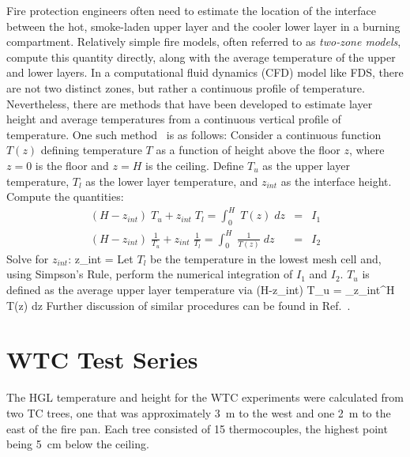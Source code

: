 Fire protection engineers often need to estimate the location of the
interface between the hot, smoke-laden upper layer and the cooler
lower layer in a burning compartment.  Relatively simple fire models,
often referred to as {\em two-zone models}, compute this quantity
directly, along with the average temperature of the upper and lower
layers.  In a computational fluid dynamics (CFD) model like FDS, there
are not two distinct zones, but rather a continuous profile of
temperature. Nevertheless, there are methods that have been developed
to estimate layer height and average temperatures from a continuous
vertical profile of temperature. One such
method~\cite{Janssens:JFS1992} is as follows: Consider a continuous
function $T(z)$ defining temperature $T$ as a function of height above
the floor $z$, where $z=0$ is the floor and $z=H$ is the
ceiling. Define $T_u$ as the upper layer temperature, $T_l$ as the
lower layer temperature, and $z_{int}$ as the interface
height. Compute the quantities:
\begin{eqnarray*} (H-z_{int})\; T_u + z_{int} \; T_l = \int_0^H \; T(z) \; dz &=& I_1 \\
                  (H-z_{int})\; \frac{1}{T_u} + z_{int} \; \frac{1}{T_l} = \int_0^H \; \frac{1}{T(z)} \; dz &=& I_2 \end{eqnarray*}
Solve for $z_{int}$:
\be z_{int} =  \ee
Let $T_l$ be the temperature in the lowest mesh cell and, using
Simpson's Rule, perform the numerical integration of $I_1$ and
$I_2$. $T_u$ is defined as the average upper layer temperature via
\be (H-z_{int})\; T_u = \int_{z_{int}}^H \; T(z) \; dz \ee
Further discussion of similar procedures can be found in Ref.~\cite{He:1}.

\section{WTC Test Series}

The HGL temperature and height for the WTC experiments were calculated from two TC trees, one that was approximately 3~m to the west and one
2~m to the east of the fire pan. Each tree consisted of 15 thermocouples, the highest point being 5~cm below the ceiling.

